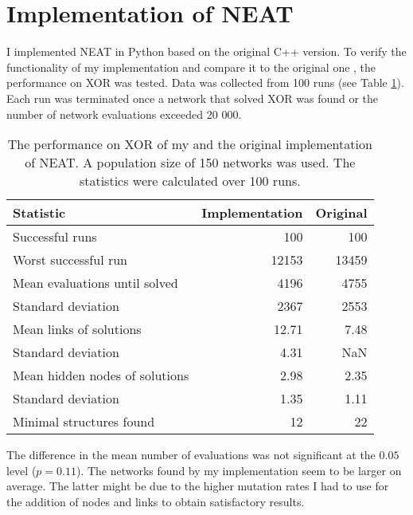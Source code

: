 \section{Implementation of NEAT}

I implemented NEAT in Python based on the original C++ version. To verify the functionality of my implementation and compare it to
the original one \cite{neat_main}, the performance on XOR was tested. Data was collected from 100 runs (see Table \ref{xor_verification}).
Each run was terminated once a network that solved XOR was found or the number of network evaluations exceeded 20 000.
\begin{table}[H]
    \centering
    \begin{tabular}{lrr}
    \toprule
    Statistic & \multicolumn{1}{r}{Implementation} & \multicolumn{1}{r}{Original \cite{neat_main}} \\
    \midrule
    Successful runs & 100 & 100 \\
    Worst successful run & 12153 & 13459 \\
    \rowcolor[gray]{.9} Mean evaluations until solved & 4196 & 4755\\
    Standard deviation & 2367 & 2553\\
    \rowcolor[gray]{.9} Mean links of solutions & 12.71 & 7.48\\
    Standard deviation & 4.31 & NaN\\
    \rowcolor[gray]{.9} Mean hidden nodes of solutions & 2.98 & 2.35\\
    Standard deviation & 1.35 & 1.11\\
    Minimal structures found & 12 & 22\\
    \bottomrule
    \end{tabular}
    \caption{The performance on XOR of my and the original implementation of NEAT. A population size of 150 networks was used.
             The statistics were calculated over 100 runs.}
    \label{xor_verification}
\end{table}
The difference in the mean number of evaluations was not significant at the $0.05$ level ($p=0.11$).
The networks found by my implementation seem to be larger on average.
The latter might be due to the higher mutation rates I had to use for the addition of nodes and links
to obtain satisfactory results.
